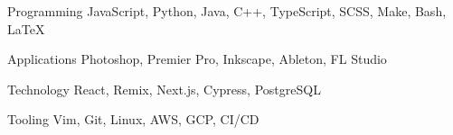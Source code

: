 

\begin{cvskills}

  \cvskill
    {Programming} %
    {JavaScript, Python, Java, C++, TypeScript, SCSS, Make, Bash, \LaTeX} %

  \cvskill
    {Applications} %
    {Photoshop, Premier Pro, Inkscape, Ableton, FL Studio} %

  \cvskill
    {Technology} %
    {React, Remix, Next.js, Cypress, PostgreSQL} %

  \cvskill
    {Tooling} %
    {Vim, Git, Linux, AWS, GCP, CI/CD} %

\end{cvskills}
